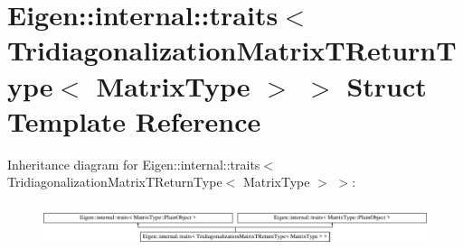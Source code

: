 \hypertarget{struct_eigen_1_1internal_1_1traits_3_01_tridiagonalization_matrix_t_return_type_3_01_matrix_type_01_4_01_4}{}\section{Eigen\+:\+:internal\+:\+:traits$<$ Tridiagonalization\+Matrix\+T\+Return\+Type$<$ Matrix\+Type $>$ $>$ Struct Template Reference}
\label{struct_eigen_1_1internal_1_1traits_3_01_tridiagonalization_matrix_t_return_type_3_01_matrix_type_01_4_01_4}
Inheritance diagram for Eigen\+:\+:internal\+:\+:traits$<$ Tridiagonalization\+Matrix\+T\+Return\+Type$<$ Matrix\+Type $>$ $>$\+:\begin{figure}[H]
\begin{center}
\leavevmode
\includegraphics[height=1.244444cm]{struct_eigen_1_1internal_1_1traits_3_01_tridiagonalization_matrix_t_return_type_3_01_matrix_type_01_4_01_4}
\end{center}
\end{figure}
